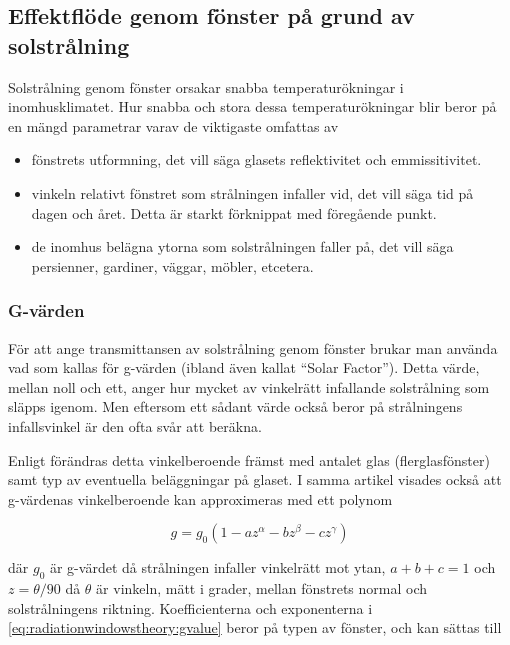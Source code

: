 \subsection{Effektflöde genom fönster på grund av solstrålning}

Solstrålning genom fönster orsakar snabba temperaturökningar i inomhusklimatet. Hur snabba och stora dessa temperaturökningar blir beror på en mängd parametrar varav de viktigaste omfattas av

\begin{itemize}
\item{
fönstrets utformning, det vill säga glasets reflektivitet och emmissitivitet.
}
\item{
vinkeln relativt fönstret som strålningen infaller vid, det vill säga tid på dagen och året. Detta är starkt förknippat med föregående punkt. 
}
\item{
de inomhus belägna ytorna som solstrålningen faller på, det vill säga persienner, gardiner, väggar, möbler, etcetera.
}
\end{itemize} 

\subsubsection{G-värden}\label{gvalue}

För att ange transmittansen av solstrålning genom fönster brukar man använda vad som kallas för g-värden (ibland även kallat ``Solar Factor''). Detta värde, mellan noll och ett, anger hur mycket av vinkelrätt infallande solstrålning som släpps igenom. Men eftersom ett sådant värde också beror på strålningens infallsvinkel är den ofta svår att beräkna.

Enligt \cite{karlssonroos99} förändras detta vinkelberoende främst med antalet glas (flerglasfönster) samt typ av eventuella beläggningar på glaset. I samma artikel visades också att g-värdenas vinkelberoende kan approximeras med ett polynom

\begin{equation}\label{eq:radiationwindowstheory:gvalue}
g = g_0 \left( 1 - az^{\alpha} - bz^{\beta} - cz^{\gamma} \right)
\end{equation}

där $g_0$ är g-värdet då strålningen infaller vinkelrätt mot ytan, $a+b+c=1$ och $z=\theta/90$ då $\theta$ är vinkeln, mätt i grader, mellan fönstrets normal och solstrålningens riktning. Koefficienterna och exponenterna i \eqref{eq:radiationwindowstheory:gvalue} beror på typen av fönster, och kan sättas till

